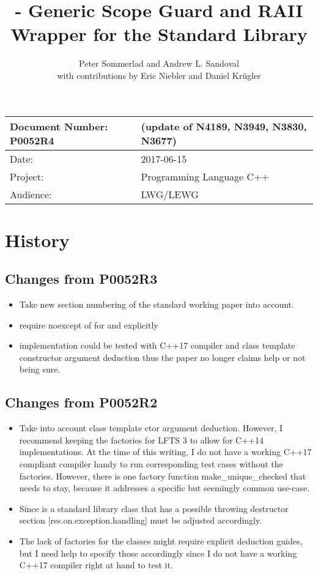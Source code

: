 \documentclass[ebook,11pt,article]{memoir}
\title{\papernumber{} - Generic Scope Guard and RAII Wrapper for the Standard Library}
\author{Peter Sommerlad and Andrew L. Sandoval\\with contributions by Eric Niebler and Daniel Kr\"ugler}
\date{\paperdate}                        %
\newcommand{\papernumber}{P0052R4}
\newcommand{\paperdate}{2017-06-15}
\begin{document}
\maketitle
\begin{tabular}[t]{|l|l|}\hline 
Document Number: \papernumber &   (update of N4189, N3949, N3830, N3677)\\\hline
Date: & \paperdate \\\hline
Project: & Programming Language C++\\\hline 
Audience: & LWG/LEWG\\\hline
\end{tabular}

\chapter{History}
\section{Changes from P0052R3}
\begin{itemize}
\item Take new section numbering of the standard working paper into account.
\item require noexcept of  for  and  explicitly
\item implementation could be tested with C++17 compiler and class template constructor argument deduction thus the paper no longer claims help or not being sure.
\end{itemize}


\section{Changes from P0052R2}
\begin{itemize}
\item Take into account class template ctor argument deduction. However, I recommend keeping the factories for LFTS 3 to allow for C++14 implementations. At the time of this writing, I do not have a working C++17 compliant compiler handy to run corresponding test cases without the factories. However, there is one factory function make_unique_checked that needs to stay, because it addresses a specific but seemingly common use-case.
\item Since  is a standard library class that has a possible throwing destructor section [res.on.exception.handling] must be adjusted accordingly.
\item The lack of factories for the classes might require explicit deduction guides, but I need help to specify those accordingly since I do not have a working C++17 compiler right at hand to test it.
\end{itemize}
\end{document}

